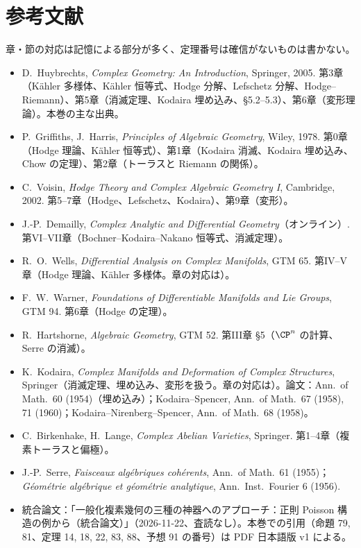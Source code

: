 \section*{参考文献}
章・節の対応は記憶による部分が多く\tQ、定理番号は確信がないものは書かない。
\begin{itemize}
\item D.~Huybrechts, \emph{Complex Geometry: An Introduction}, Springer, 2005. 第3章（Kähler 多様体、Kähler 恒等式、Hodge 分解、Lefschetz 分解、Hodge--Riemann）、第5章（消滅定理、Kodaira 埋め込み、\S5.2--5.3）、第6章（変形理論）。本巻の主な出典。
\item P.~Griffiths, J.~Harris, \emph{Principles of Algebraic Geometry}, Wiley, 1978. 第0章（Hodge 理論、Kähler 恒等式）、第1章（Kodaira 消滅、Kodaira 埋め込み、Chow の定理）、第2章（トーラスと Riemann の関係）。
\item C.~Voisin, \emph{Hodge Theory and Complex Algebraic Geometry I}, Cambridge, 2002. 第5--7章（Hodge、Lefschetz、Kodaira）、第9章（変形）。
\item J.-P.~Demailly, \emph{Complex Analytic and Differential Geometry}（オンライン）. 第VI--VII章（Bochner--Kodaira--Nakano 恒等式、消滅定理）。
\item R.~O.~Wells, \emph{Differential Analysis on Complex Manifolds}, GTM 65. 第IV--V章（Hodge 理論、Kähler 多様体。章の対応は\tQ）。
\item F.~W.~Warner, \emph{Foundations of Differentiable Manifolds and Lie Groups}, GTM 94. 第6章（Hodge の定理）。
\item R.~Hartshorne, \emph{Algebraic Geometry}, GTM 52. 第III章 \S5（$\CP^n$ の計算、Serre の消滅）。
\item K.~Kodaira, \emph{Complex Manifolds and Deformation of Complex Structures}, Springer（消滅定理、埋め込み、変形を扱う。章の対応は\tQ）。論文：Ann.\ of Math.\ 60 (1954)（埋め込み）；Kodaira--Spencer, Ann.\ of Math.\ 67 (1958), 71 (1960)；Kodaira--Nirenberg--Spencer, Ann.\ of Math.\ 68 (1958)。
\item C.~Birkenhake, H.~Lange, \emph{Complex Abelian Varieties}, Springer. 第1--4章（複素トーラスと偏極）。
\item J.-P.~Serre, \emph{Faisceaux algébriques cohérents}, Ann.\ of Math.\ 61 (1955)；\emph{Géométrie algébrique et géométrie analytique}, Ann.\ Inst.\ Fourier 6 (1956).
\item 統合論文：「一般化複素幾何の三種の神器へのアプローチ：正則 Poisson 構造の例から（統合論文）」（2026-11-22、査読なし）。本巻での引用（命題 79, 81、定理 14, 18, 22, 83, 88、予想 91 の番号）は PDF 日本語版 v1 による。
\end{itemize}

